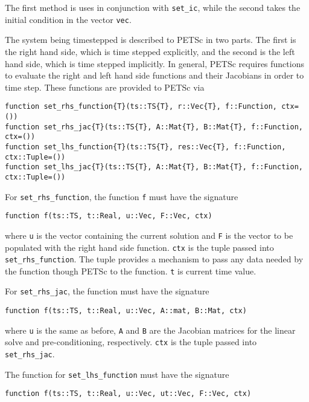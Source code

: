 \documentclass{article}
\begin{document}
The first method is uses in conjunction with \texttt{set\_ic}, while the 
second takes the initial condition in the vector \texttt{vec}.

The system being timestepped is described to PETSc in two parts.  The first is 
the right hand side, which is time stepped explicitly, and the second is the 
left hand side, which is time stepped implicitly.  In general, PETSc requires 
functions to evaluate the right and left hand side functions and their 
Jacobians  in order to time step.  These functions are provided to PETSc via

\begin{verbatim}
function set_rhs_function{T}(ts::TS{T}, r::Vec{T}, f::Function, ctx=())
function set_rhs_jac{T}(ts::TS{T}, A::Mat{T}, B::Mat{T}, f::Function, ctx=())
function set_lhs_function{T}(ts::TS{T}, res::Vec{T}, f::Function, ctx::Tuple=())
function set_lhs_jac{T}(ts::TS{T}, A::Mat{T}, B::Mat{T}, f::Function, ctx::Tuple=())
\end{verbatim}
For \texttt{set\_rhs\_function}, the function \texttt{f} must have the 
signature

\begin{verbatim}
function f(ts::TS, t::Real, u::Vec, F::Vec, ctx)
\end{verbatim}

where \texttt{u} is the vector containing the current solution and \texttt{F}
is the vector to be populated with the right hand side function.  \texttt{ctx}
is the tuple passed into \texttt{set\_rhs\_function}.  The tuple provides a 
mechanism to pass any data needed by the function though PETSc to the function.
\texttt{t} is current time value.

For \texttt{set\_rhs\_jac}, the function must have the signature

\begin{verbatim}
function f(ts::TS, t::Real, u::Vec, A::mat, B::Mat, ctx)
\end{verbatim}

\noindent where \texttt{u} is the same as before, \texttt{A} and \texttt{B} are the 
Jacobian matrices for the linear solve and pre-conditioning, respectively.  
\texttt{ctx} is the tuple passed into \texttt{set\_rhs\_jac}.

The function for \texttt{set\_lhs\_function} must have the signature

\begin{verbatim}
function f(ts::TS, t::Real, u::Vec, ut::Vec, F::Vec, ctx)
\end{verbatim}
\end{document}
